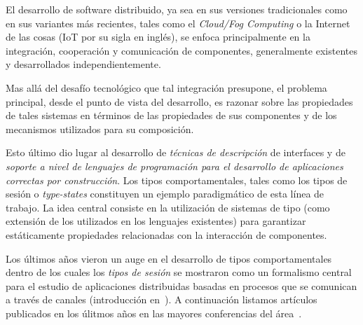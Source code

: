 El desarrollo de software distribuido, ya sea en sus versiones tradicionales
como en sus variantes más recientes, tales como el \emph{Cloud/Fog Computing} o
la Internet de las cosas (IoT por su sigla en inglés), se enfoca
principalmente en la integración, cooperación y comunicación de componentes,
generalmente existentes y desarrollados independientemente.

Mas allá del desafío tecnológico que tal integración presupone, el
problema principal, desde el punto de vista del desarrollo, es razonar sobre
las propiedades de tales sistemas en términos de las propiedades de sus
componentes y de los mecanismos utilizados para su composición.

Esto último dio lugar al desarrollo de {\em técnicas de
descripción} de interfaces y de {\em soporte a nivel de lenguajes de
programación para el desarrollo de aplicaciones correctas por construcción}.
Los tipos comportamentales, tales como los tipos de sesión o {\em type-states}
constituyen un ejemplo paradigmático de esta línea de trabajo. La idea central
consiste en la utilización de sistemas de tipo (como extensión de los
utilizados en los lenguajes existentes) para garantizar estáticamente
propiedades relacionadas con la interacción de componentes.

Los últimos años vieron un auge en el desarrollo de tipos comportamentales
dentro de los cuales los {\em tipos de sesión} se mostraron como un formalismo
central para el estudio de aplicaciones distribuidas basadas en procesos que se
comunican a través de canales (introducción en~\cite{HuttelEtAl16}). A
continuación listamos artículos publicados en los úlitmos años en las mayores
conferencias del área~\cite{DBLP:journals/pacmpl/GhilezanPPSY21,
DBLP:journals/pacmpl/HinrichsenBK20, DBLP:journals/pacmpl/Castro-PerezY20,
DBLP:conf/ecoop/ImaiNYY19, DBLP:conf/ecoop/000119, DBLP:conf/esop/JongmansY20,
DBLP:conf/esop/VasconcelosCAM20, DBLP:conf/concur/Horne20,
DBLP:conf/concur/DasP20, DBHPS21,DBLP:conf/cc/Miu0Y021,
DBLP:journals/pacmpl/GriesemerHKLTTW20, DBLP:journals/pacmpl/MajumdarYZ20,
DBLP:conf/concur/InversoMPTT20}.


